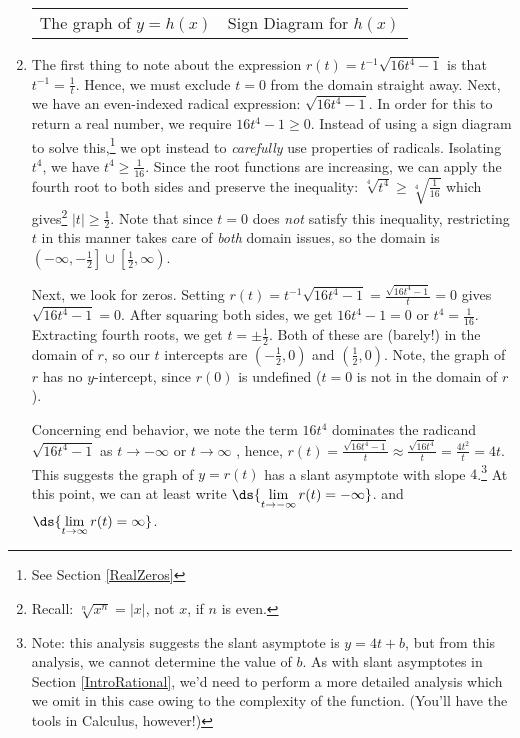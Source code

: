 \documentclass{ximera}
\begin{document}
\begin{example}
\begin{enumerate}
\begin{center}
\begin{tabular}{cc}
The graph of $y=h(x)$  \hspace{0.75in} & Sign Diagram for $h(x)$ \\


\end{tabular}
\end{center} 



\item  The first thing to note about the expression  $r(t) = t^{-1} \sqrt{16t^4-1}$ is that $t^{-1} = \frac{1}{t}$.  Hence, we must exclude $t=0$ from the domain straight away. Next, we have an even-indexed radical expression: $\sqrt{16t^4-1}$.  In order for this to return a real number, we require  $16t^4-1 \geq 0$.  Instead of using a sign diagram to solve this,\footnote{See Section \ref{RealZeros}} we opt instead to  \textit{carefully} use properties of radicals.  Isolating $t^4$, we have $t^4 \geq \frac{1}{16}$.  Since the root functions are increasing, we can apply the fourth root to both sides and preserve the inequality:  $\sqrt[4]{t^4} \geq \sqrt[4]{\frac{1}{16}}$ which gives\footnote{Recall: $\sqrt[n]{x^n} = |x|$, not $x$,  if $n$ is even.} $|t| \geq \frac{1}{2}$. Note that since $t =0$ does \textit{not} satisfy this inequality, restricting $t$ in this manner takes care of  \textit{both} domain issues, so the domain is  $\left(-\infty, -\frac{1}{2} \right] \cup \left[\frac{1}{2}, \infty \right)$.   

Next, we look for zeros.  Setting $r(t) = t^{-1} \sqrt{16t^4-1} = \frac{\sqrt{16t^4-1}}{t}=0$ gives $\sqrt{16t^4-1} = 0$.  After squaring both sides, we get $16t^4-1 = 0$ or $t^4 = \frac{1}{16}$.  Extracting fourth roots, we get $t = \pm \frac{1}{2}$. Both of these are (barely!) in the domain of $r$, so our $t$ intercepts are $\left( -\frac{1}{2}, 0\right)$ and $\left( \frac{1}{2}, 0\right)$.  Note, the graph of $r$ has no $y$-intercept, since $r(0)$ is undefined ($t=0$ is not in the domain of $r$).  

Concerning end behavior, we note the term $16t^4$ dominates the radicand $\sqrt{16t^4-1}$ as $t \rightarrow - \infty$ or $t \rightarrow \infty$ ,  hence, $r(t) = \frac{\sqrt{16t^4-1}}{t} \approx \frac{\sqrt{16t^4}}{t} = \frac{4t^2}{t} = 4t$.  This suggests the graph of $y = r(t)$ has a slant asymptote with slope $4$.\footnote{Note: this analysis suggests the slant asymptote is $y = 4t+b$, but from this analysis, we cannot determine the value of $b$.  As with slant asymptotes in Section \ref{IntroRational}, we'd need to perform a more detailed analysis which we omit in this case owing to the complexity of the function. (You'll have the tools in Calculus, however!)}  At this point, we can at least write $\ds{\lim_{t \rightarrow -\infty} r(t) = -\infty}$. and $\ds{\lim_{t \rightarrow \infty} r(t) = \infty}$.


\end{enumerate}
\end{example}
\end{document}
